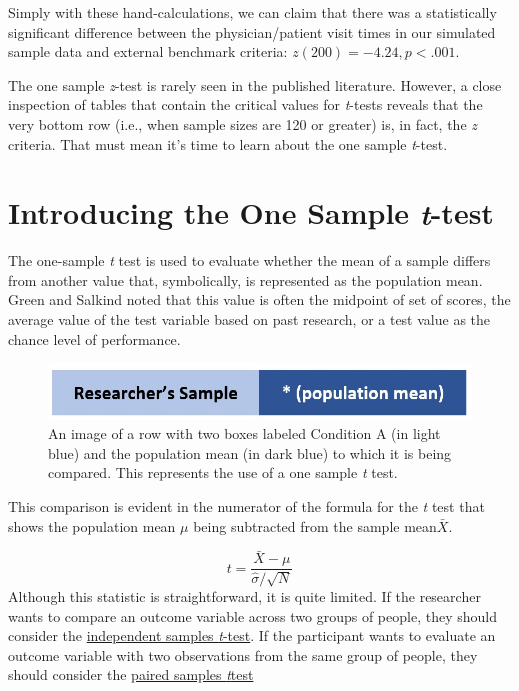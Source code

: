 \documentclass[
  11pt,
]{book}
\begin{document}
Simply with these hand-calculations, we can claim that there was a statistically significant difference between the physician/patient visit times in our simulated sample data and external benchmark criteria: \(z(200) = -4.24, p < .001\).

The one sample \emph{z}-test is rarely seen in the published literature. However, a close inspection of tables that contain the critical values for \emph{t}-tests reveals that the very bottom row (i.e., when sample sizes are 120 or greater) is, in fact, the \emph{z} criteria. That must mean it's time to learn about the one sample \emph{t}-test.

\hypertarget{introducing-the-one-sample-t-test}{%
\section{\texorpdfstring{Introducing the One Sample \emph{t}-test}{Introducing the One Sample t-test}}\label{introducing-the-one-sample-t-test}}

The one-sample \emph{t} test is used to evaluate whether the mean of a sample differs from another value that, symbolically, is represented as the population mean. Green and Salkind \citep{green_using_2014} noted that this value is often the midpoint of set of scores, the average value of the test variable based on past research, or a test value as the chance level of performance.

\begin{figure}
\centering
\includegraphics{images/ttests/onesample.jpg}
\caption{An image of a row with two boxes labeled Condition A (in light blue) and the population mean (in dark blue) to which it is being compared. This represents the use of a one sample \emph{t} test.}
\end{figure}

This comparison is evident in the numerator of the formula for the \emph{t} test that shows the population mean \(\mu\) being subtracted from the sample mean\(\bar{X}\).

\[
t = \frac{\bar{X} - \mu}{\hat{\sigma}/\sqrt{N} }
\]
Although this statistic is straightforward, it is quite limited. If the researcher wants to compare an outcome variable across two groups of people, they should consider the \protect\hyperlink{tIndSample}{independent samples \emph{t}-test}. If the participant wants to evaluate an outcome variable with two observations from the same group of people, they should consider the \protect\hyperlink{tPaired}{paired samples \emph{t}test}
\end{document}
